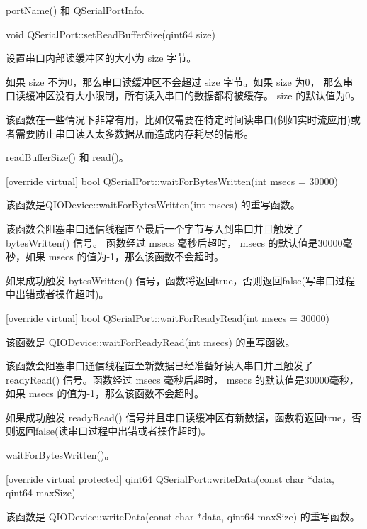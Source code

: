 \begin{seeAlso}
portName() 和 QSerialPortInfo.
\end{seeAlso}

void QSerialPort::setReadBufferSize(qint64 size)

设置串口内部读缓冲区的大小为 size 字节。

如果 size 不为0，那么串口读缓冲区不会超过 size 字节。如果 size 为0，
那么串口读缓冲区没有大小限制，所有读入串口的数据都将被缓存。 size 的默认值为0。

该函数在一些情况下非常有用，比如仅需要在特定时间读串口(例如实时流应用)或者需要防止串口读入太多数据从而造成内存耗尽的情形。

\begin{seeAlso}
readBufferSize() 和 read()。
\end{seeAlso}

[override virtual] bool QSerialPort::waitForBytesWritten(int msecs = 30000)

该函数是QIODevice::waitForBytesWritten(int msecs) 的重写函数。

该函数会阻塞串口通信线程直至最后一个字节写入到串口并且触发了 bytesWritten() 信号。
函数经过 msecs 毫秒后超时， msecs 的默认值是30000毫秒，如果 msecs 的值为-1，那么该函数不会超时。

如果成功触发 bytesWritten() 信号，函数将返回true，否则返回false(写串口过程中出错或者操作超时)。

[override virtual] bool QSerialPort::waitForReadyRead(int msecs = 30000)

该函数是 QIODevice::waitForReadyRead(int msecs) 的重写函数。

该函数会阻塞串口通信线程直至新数据已经准备好读入串口并且触发了 readyRead() 信号。函数经过 msecs 毫秒后超时， msecs 的默认值是30000毫秒，如果 msecs 的值为-1，那么该函数不会超时。

如果成功触发 readyRead() 信号并且串口读缓冲区有新数据，函数将返回true，否则返回false(读串口过程中出错或者操作超时)。

\begin{seeAlso}
waitForBytesWritten()。
\end{seeAlso}

[override virtual protected] qint64 QSerialPort::writeData(const char *data, qint64 maxSize)

该函数是 QIODevice::writeData(const char *data, qint64 maxSize) 的重写函数。